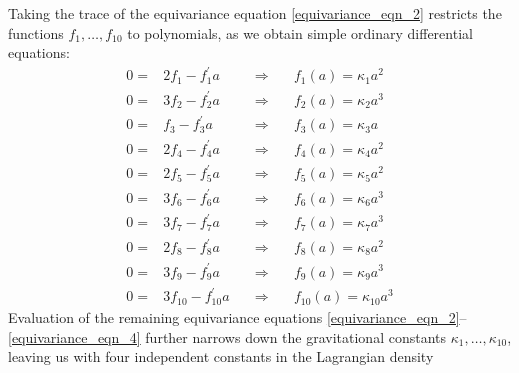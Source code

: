 Taking the trace of the equivariance equation \eqref{equivariance_eqn_2} restricts the functions $f_1,\dots, f_{10}$ to polynomials, as we obtain simple ordinary differential equations:
\begin{equation}
  \begin{aligned}
    0 = {} & 2 f_1 - f_1^\prime a \quad & \Rightarrow & \quad f_1(a) = \kappa_1 a^2 \\
    0 = {} & 3 f_2 - f_2^\prime a \quad & \Rightarrow & \quad f_2(a) = \kappa_2 a^3 \\
    0 = {} & f_3 - f_3^\prime a \quad & \Rightarrow & \quad f_3(a) = \kappa_3 a \\
    0 = {} & 2 f_4 - f_4^\prime a \quad & \Rightarrow & \quad f_4(a) = \kappa_4 a^2 \\
    0 = {} & 2 f_5 - f_5^\prime a \quad & \Rightarrow & \quad f_5(a) = \kappa_5 a^2 \\
    0 = {} & 3 f_6 - f_6^\prime a \quad & \Rightarrow & \quad f_6(a) = \kappa_6 a^3 \\
    0 = {} & 3 f_7 - f_7^\prime a \quad & \Rightarrow & \quad f_7(a) = \kappa_7 a^3 \\
    0 = {} & 2 f_8 - f_8^\prime a \quad & \Rightarrow & \quad f_8(a) = \kappa_8 a^2 \\
    0 = {} & 3 f_9 - f_9^\prime a \quad & \Rightarrow & \quad f_9(a) = \kappa_9 a^3 \\
    0 = {} & 3 f_{10} - f_{10}^\prime a \quad & \Rightarrow & \quad f_{10}(a) = \kappa_{10} a^3
  \end{aligned}
\end{equation}
Evaluation of the remaining equivariance equations \eqref{equivariance_eqn_2}--\eqref{equivariance_eqn_4} further narrows down the gravitational constants $\kappa_1,\dots,\kappa_{10}$, leaving us with four independent constants in the Lagrangian density

